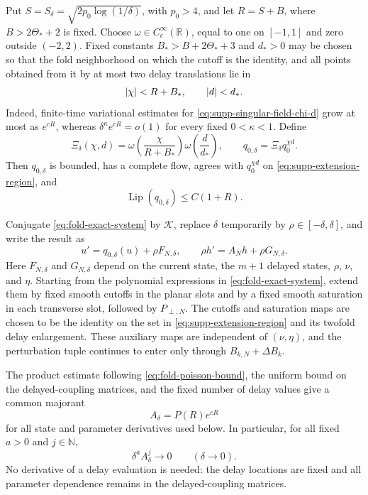 Put \(S=S_\delta=\sqrt{2p_0\log(1/\delta)}\), with \(p_0>4\), and let
\(R=S+B\), where \(B>2\Theta_*+2\) is fixed.  Choose
\(\omega\in C_c^\infty(\mathbb R)\), equal to one on \([-1,1]\) and
zero outside \((-2,2)\).  Fixed constants \(B_*>B+2\Theta_*+3\) and
\(d_*>0\) may be chosen so that the fold neighborhood on which the cutoff is
the identity, and all points obtained
from it by at most two delay translations lie in
\begin{equation}
 \left\lvert\chi\right\rvert<R+B_* ,\qquad \left\lvert d\right\rvert<d_*.
 \label{eq:supp-extension-region}
\end{equation}
Indeed, finite-time variational estimates for
\eqref{eq:supp-singular-field-chi-d} grow at most as \(e^{cR}\), whereas
\(\delta^\kappa e^{cR}=o(1)\) for every fixed \(0<\kappa<1\).
Define
\begin{equation}
 \Xi_\delta(\chi,d)
 =\omega\!\left(\frac{\chi}{R+B_*}\right)
  \omega\!\left(\frac d{d_*}\right),\qquad
 q_{0,\delta}=\Xi_\delta q_0^{\chi d}.
 \label{eq:supp-global-singular-field}
\end{equation}
Then \(q_{0,\delta}\) is bounded, has a complete flow, agrees with
\(q_0^{\chi d}\) on \eqref{eq:supp-extension-region}, and
\begin{equation}
 \operatorname{Lip}(q_{0,\delta})\le C(1+R).
 \label{eq:supp-singular-lipschitz}
\end{equation}

Conjugate \cref{eq:fold-exact-system} by \(\mathcal K\), replace
\(\delta\) temporarily by \(\rho\in[-\delta,\delta]\), and write the
result as
\begin{equation}
 u'=q_{0,\delta}(u)+\rho F_{N,\delta},\qquad
 \rho h'=A_Nh+\rho G_{N,\delta}.
 \label{eq:supp-extended-normal-form}
\end{equation}
Here \(F_{N,\delta}\) and \(G_{N,\delta}\) depend on the current state,
the \(m+1\) delayed states, \(\rho\), \(\nu\), and \(\eta\).  Starting
from the polynomial expressions in \cref{eq:fold-exact-system}, extend
them by fixed smooth cutoffs in the planar slots and by a fixed smooth
saturation in each transverse slot, followed by \(P_{\perp,N}\).  The
cutoffs and saturation maps are chosen to be the identity on the set in
\eqref{eq:supp-extension-region} and its twofold delay enlargement.  These
auxiliary maps are independent of \((\nu,\eta)\), and the perturbation tuple
continues to enter only through \(B_{k,N}+\Delta B_k\).

The product estimate following \cref{eq:fold-poisson-bound}, the uniform
bound on the delayed-coupling matrices, and the fixed number of delay values
give a common majorant
\begin{equation}
 A_\delta=P(R)e^{cR}
 \label{eq:supp-global-majorant}
\end{equation}
for all state and parameter derivatives used below.  In particular, for
all fixed \(a>0\) and \(j\in\mathbb N\),
\begin{equation}
 \delta^aA_\delta^j\longrightarrow0
 \qquad(\delta\to0).
 \label{eq:supp-subpower-property}
\end{equation}
No derivative of a delay evaluation is needed: the delay locations are
fixed and all parameter dependence remains in the delayed-coupling matrices.

